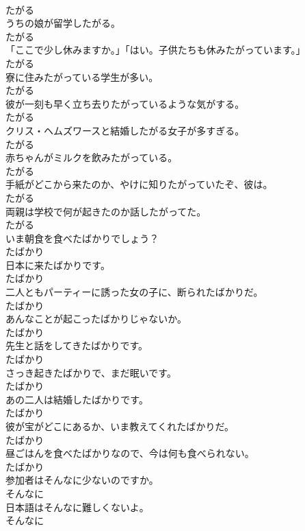 \documentclass[8pt]{extreport}
\begin{document}
\begin{CJK}{UTF8}{min}
\\	たがる
\\	うちの娘が留学したがる。	
\\	たがる
\\	「ここで少し休みますか。」「はい。子供たちも休みたがっています。」	
\\	たがる
\\	寮に住みたがっている学生が多い。	
\\	たがる
\\	彼が一刻も早く立ち去りたがっているような気がする。	
\\	たがる
\\	クリス・ヘムズワースと結婚したがる女子が多すぎる。	
\\	たがる
\\	赤ちゃんがミルクを飲みたがっている。	
\\	たがる
\\	手紙がどこから来たのか、やけに知りたがっていたぞ、彼は。	
\\	たがる
\\	両親は学校で何が起きたのか話したがってた。	
\\	たがる
\\	いま朝食を食べたばかりでしょう？	
\\	たばかり
\\	日本に来たばかりです。	
\\	たばかり
\\	二人ともパーティーに誘った女の子に、断られたばかりだ。	
\\	たばかり
\\	あんなことが起こったばかりじゃないか。	
\\	たばかり
\\	先生と話をしてきたばかりです。	
\\	たばかり
\\	さっき起きたばかりで、まだ眠いです。	
\\	たばかり
\\	あの二人は結婚したばかりです。	
\\	たばかり
\\	彼が宝がどこにあるか、いま教えてくれたばかりだ。	
\\	たばかり
\\	昼ごはんを食べたばかりなので、今は何も食べられない。	
\\	たばかり
\\	参加者はそんなに少ないのですか。	
\\	そんなに
\\	日本語はそんなに難しくないよ。	
\\	そんなに

\end{CJK}
\end{document}
